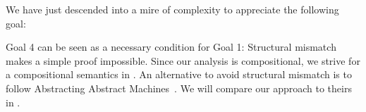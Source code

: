 We have just descended into a mire of complexity to appreciate the following
goal:


Goal 4 can be seen as a necessary condition for Goal 1:
Structural mismatch makes a simple proof impossible.
Since our analysis is compositional, we strive for a compositional semantics in
.
An alternative to avoid structural mismatch is to follow Abstracting Abstract
Machines~\citep{aam}.
We will compare our approach to theirs in .

%

